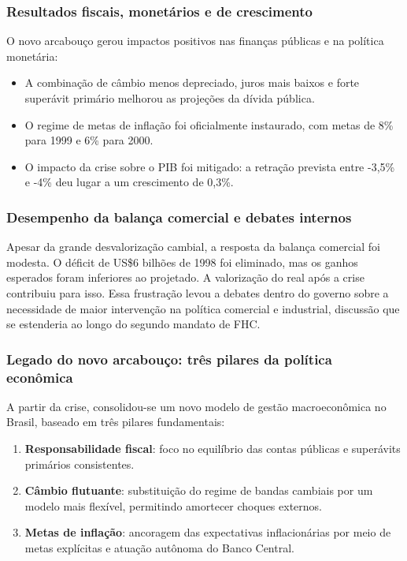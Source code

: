 \documentclass[a4paper,12pt]{article}[abntex2]
\begin{document}
\subsubsection{\textbf{Resultados fiscais, monetários e de crescimento}}

O novo arcabouço gerou impactos positivos nas finanças públicas e na política monetária:

\begin{itemize}
    \item A combinação de câmbio menos depreciado, juros mais baixos e forte superávit primário melhorou as projeções da dívida pública.
    \item O regime de metas de inflação foi oficialmente instaurado, com metas de 8\% para 1999 e 6\% para 2000.
    \item O impacto da crise sobre o PIB foi mitigado: a retração prevista entre -3,5\% e -4\% deu lugar a um crescimento de 0,3\%.
\end{itemize}

\subsubsection{\textbf{Desempenho da balança comercial e debates internos}}

Apesar da grande desvalorização cambial, a resposta da balança comercial foi modesta. O déficit de US\$6 bilhões de 1998 foi eliminado, mas os ganhos esperados foram inferiores ao projetado. A valorização do real após a crise contribuiu para isso. Essa frustração levou a debates dentro do governo sobre a necessidade de maior intervenção na política comercial e industrial, discussão que se estenderia ao longo do segundo mandato de FHC.

\subsubsection{\textbf{Legado do novo arcabouço: três pilares da política econômica}}

A partir da crise, consolidou-se um novo modelo de gestão macroeconômica no Brasil, baseado em três pilares fundamentais:

\begin{enumerate}
    \item \textbf{Responsabilidade fiscal}: foco no equilíbrio das contas públicas e superávits primários consistentes.
    \item \textbf{Câmbio flutuante}: substituição do regime de bandas cambiais por um modelo mais flexível, permitindo amortecer choques externos.
    \item \textbf{Metas de inflação}: ancoragem das expectativas inflacionárias por meio de metas explícitas e atuação autônoma do Banco Central.
\end{enumerate}
\end{document}
